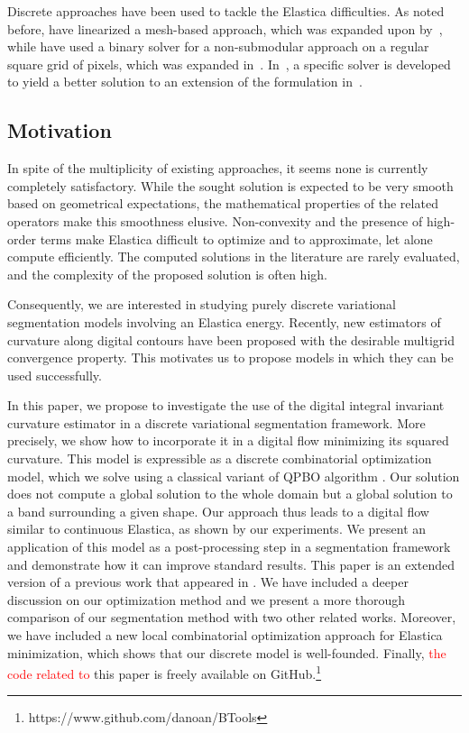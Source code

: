 \documentclass[smallextended]{svjour3}       %
\newcommand{\revision}[1]{\textcolor{red}{#1}}
\begin{document}
Discrete approaches have been used to tackle the Elastica
difficulties. As noted before, \cite{schoenemann09linear} have
linearized a mesh-based approach, which was expanded upon
by~\cite{strandmark11globalframework}, while \cite{zehiry10fast} have
used a binary solver for a non-submodular approach on a regular square
grid of pixels, which was expanded
in~\cite{el2016contrast}. In~\cite{nieuwenhuis14efficient}, a
specific solver is developed to yield a better solution to an
extension of the formulation in~\cite{zehiry10fast}.


\subsection{Motivation}
In spite of the multiplicity of existing approaches, it seems none is
currently completely satisfactory. While the sought solution is
expected to be very smooth based on geometrical expectations, the
mathematical properties of the related operators make this smoothness
elusive. Non-convexity and the presence of high-order terms make
Elastica difficult to optimize and to approximate, let alone compute
efficiently. The computed solutions in the literature are rarely
evaluated, and the complexity of the proposed solution is often high.


Consequently, we are interested in studying purely discrete
variational segmentation models involving an Elastica
energy. Recently, new estimators of curvature along digital contours
have been proposed
\cite{roussillon11mdca,coeurjolly13integral,schindele17mdca} with the
desirable multigrid convergence property. This motivates us to propose
models in which they can be used successfully.


In this paper, we propose to investigate the use of the digital
integral invariant curvature estimator \cite{coeurjolly13integral} in
a discrete variational segmentation framework. More precisely, we show
how to incorporate it in a digital flow minimizing its squared
curvature. This model is expressible as a discrete combinatorial
optimization model, which we solve using a classical variant of QPBO
algorithm \cite{rother07qpbo}. Our solution does not compute a global
solution to the whole domain but a global solution to a band
surrounding a given shape. Our approach thus leads to a digital flow
similar to continuous Elastica, as shown by our experiments. We
present an application of this model as a post-processing step in a
segmentation framework and demonstrate how it can improve standard
results. This paper is an extended version of a previous work that
appeared in \cite{antunes19}. We have included a deeper discussion on
our optimization method and we present a more thorough comparison of
our segmentation method with two other related works. Moreover, we
have included a new local combinatorial optimization approach for
Elastica minimization, which shows that our discrete model is
well-founded. Finally, \revision{the code related to} this paper is freely
available on GitHub.\footnote{https://www.github.com/danoan/BTools}
\end{document}
